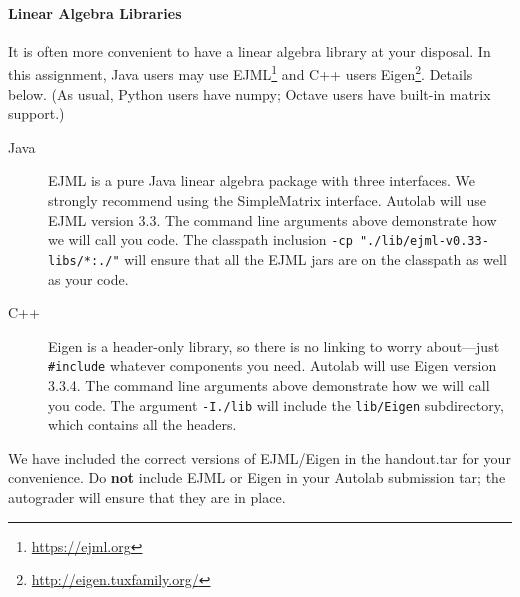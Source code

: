 \documentclass[11pt]{article}
\numberwithin{equation}{section} %
\numberwithin{figure}{section} %
\numberwithin{table}{section} %
\begin{document}
\begin{notebox}
\paragraph{Linear Algebra Libraries} It is often more convenient to have a linear algebra library at your disposal. In this assignment, Java users may use EJML\footnote{\url{https://ejml.org}} and C++ users Eigen\footnote{\url{http://eigen.tuxfamily.org/}}. Details below. 
%
(As usual, Python users have numpy; Octave users have built-in matrix support.)
%
\begin{description}
\item[Java] EJML is a pure Java linear algebra package with three interfaces. We strongly recommend using the SimpleMatrix interface. Autolab will use EJML version 3.3. The command line arguments above demonstrate how we will call you code. The classpath inclusion \lstinline{-cp "./lib/ejml-v0.33-libs/*:./"} will ensure that all the EJML jars are on the classpath as well as your code. 
\item[C++] Eigen is a header-only library, so there is no linking to worry about---just \lstinline{#include} whatever components you need. Autolab will use Eigen version 3.3.4. The command line arguments above demonstrate how we will call you code. The argument \lstinline{-I./lib} will include the \lstinline{lib/Eigen} subdirectory, which contains all the headers.
\end{description} 
We have included the correct versions of EJML/Eigen in the handout.tar for your convenience. Do {\bf not} include EJML or Eigen in your Autolab submission tar; the autograder will ensure that they are in place. 
\end{notebox}
%

%
%
\end{document}
